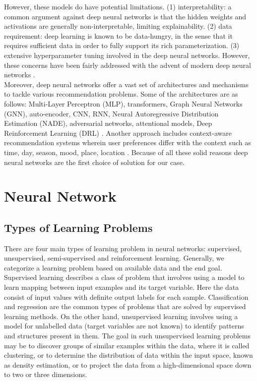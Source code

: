 \documentclass{kththesis}
\begin{document}
However, these models do have potential limitations. (1) interpretability: a common argument against deep neural networks is that the hidden weights and activations are generally non-interpretable, limiting explainability. (2) data requirement: deep learning is known to be data-hungry, in the sense that it requires sufficient data in order to fully support its rich parameterization. (3) extensive hyperparameter tuning involved in the deep neural networks. However, these concerns have been fairly addressed with the advent of modern deep neural networks \cite{shuai}. \\

Moreover, deep neural networks offer a vast set of architectures and mechanisms to tackle various recommendation problems. Some of the architectures are as follows: Multi-Layer Perceptron (MLP), transformers, Graph Neural Networks (GNN), auto-encoder, CNN, RNN, Neural Autoregressive Distribution Estimation (NADE), adversarial networks, attentional models, Deep Reinforcement Learning (DRL) \cite{shuai}. Another approach includes context-aware recommendation systems wherein user preferences differ with the context such as time, day, season, mood, place, location \cite{khalid}. Because of all these solid reasons deep neural networks are the first choice of solution for our case. 

\section{Neural Network}
\subsection{Types of Learning Problems}
There are four main types of learning problem in neural networks: supervised, unsupervised, semi-supervised and reinforcement learning. Generally, we categorize a learning problem based on available data and the end goal. \\

Supervised learning describes a class of problem that involves using a model to learn mapping between input examples and its target variable. Here the data consist of input values with definite output labels for each sample. Classification and regression are the common types of problems that are solved by supervised learning methods. On the other hand, unsupervised learning involves using a model for unlabelled data (target variables are not known) to identify patterns and structures present in them. The goal in such unsupervised learning problems may be to discover groups of similar examples within the data, where it is called clustering, or to determine the distribution of data within the input space, known as density estimation, or to project the data from a high-dimensional space down to two or three dimensions. \\
\end{document}
